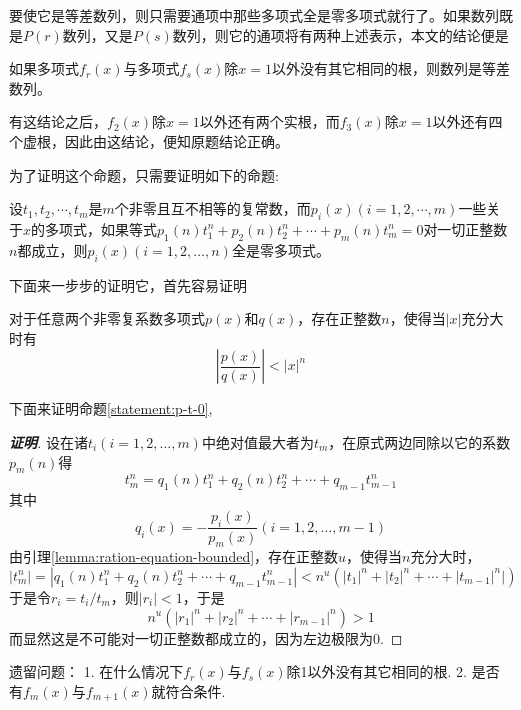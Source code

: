\documentclass{ctexart}
\begin{document}
  要使它是等差数列，则只需要通项中那些多项式全是零多项式就行了。如果数列既是$P(r)$数列，又是$P(s)$数列，则它的通项将有两种上述表示，本文的结论便是
  \begin{statement}
    如果多项式$f_r(x)$与多项式$f_s(x)$除$x=1$以外没有其它相同的根，则数列是等差数列。
  \end{statement}
  有这结论之后，$f_2(x)$除$x=1$以外还有两个实根，而$f_3(x)$除$x=1$以外还有四个虚根，因此由这结论，便知原题结论正确。

  为了证明这个命题，只需要证明如下的命题:
\begin{statement}
  \label{statement:p-t-0}
    设$t_1,t_2,\cdots,t_m$是$m$个非零且互不相等的复常数，而$p_i(x)(i=1,2,\cdots,m)$一些关于$x$的多项式，如果等式$p_1(n)t_1^n+p_2(n)t_2^n+\cdots+p_m(n)t_m^n=0$对一切正整数$n$都成立，则$p_i(x)(i=1,2,\ldots,n)$全是零多项式。
\end{statement}

下面来一步步的证明它，首先容易证明
\begin{lemma}
  \label{lemma:ration-equation-bounded}
  对于任意两个非零复系数多项式$p(x)$和$q(x)$，存在正整数$n$，使得当$|x|$充分大时有
  \[ \left| \frac{p(x)}{q(x)} \right| < |x|^n \]
\end{lemma}

下面来证明命题\ref{statement:p-t-0},
\begin{proof}[\textbf{证明}]
  设在诸$t_i(i=1,2,\ldots,m)$中绝对值最大者为$t_m$，在原式两边同除以它的系数$p_m(n)$得
  \[ t_m^n = q_1(n)t_1^n+q_2(n)t_2^n+\cdots+q_{m-1}t_{m-1}^n \]
  其中
  \[ q_i(x) = - \frac{p_i(x)}{p_m(x)} (i=1,2,\ldots,m-1) \]
  由引理\ref{lemma:ration-equation-bounded}，存在正整数$u$，使得当$n$充分大时，
  \[ |t_m^n|=|q_1(n)t_1^n+q_2(n)t_2^n+\cdots+q_{m-1}t_{m-1}^n| < n^u(|t_1|^n+|t_2|^n+\cdots+|t_{m-1}|^n|) \]
  于是令$r_i=t_i/t_m$，则$|r_i| < 1$，于是
  \[ n^u(|r_1|^n+|r_2|^n+\cdots+|r_{m-1}|^n) > 1  \]
  而显然这是不可能对一切正整数都成立的，因为左边极限为0.
\end{proof}

遗留问题：
1. 在什么情况下$f_r(x)$与$f_s(x)$除1以外没有其它相同的根.
2. 是否有$f_m(x)$与$f_{m+1}(x)$就符合条件.
 
\end{document}
